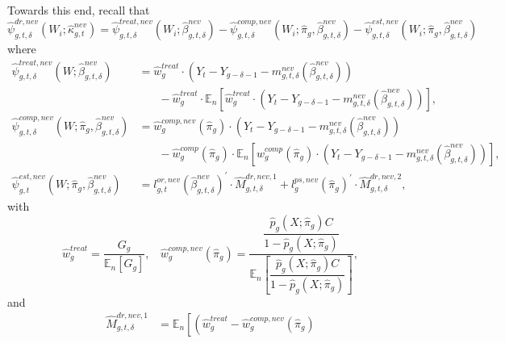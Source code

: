 \documentclass[11pt]{article}%
\theoremstyle{plain}
\numberwithin{sassumption}{section}
\numberwithin{equation}{section}
\begin{document}
{\small Towards this end, recall that%
\[
\widehat{\psi}_{g,t,\delta}^{dr,nev}(W_{i};\widehat{\kappa}_{g,t}%
^{nev})=\widehat{\psi}_{g,t,\delta}^{treat,nev}(W_{i};\widehat{\beta
}_{g,t,\delta}^{nev})-\widehat{\psi}_{g,t,\delta}^{comp,nev}(W_{i}%
;\widehat{\pi}_{g},\widehat{\beta}_{g,t,\delta}^{nev})-\widehat{\psi
}_{g,t,\delta}^{est,nev}(W_{i};\widehat{\pi}_{g},\widehat{\beta}_{g,t,\delta
}^{nev})
\]
where
\begin{align*}
\widehat{\psi}_{g,t,\delta}^{treat,nev}(W;\widehat{\beta}_{g,t,\delta}^{nev})
&  =\widehat{w}_{g}^{treat}\cdot\left(  Y_{t}-Y_{g-\delta-1}-m_{g,t,\delta
}^{nev}\left(  \widehat{\beta}_{g,t,\delta}^{nev}\right)  \right) \\
&  ~~~~~~~~-\widehat{w}_{g}^{treat}\cdot\mathbb{E}_{n}\left[  \widehat{w}%
_{g}^{treat}\cdot\left(  Y_{t}-Y_{g-\delta-1}-m_{g,t,\delta}^{nev}\left(
\widehat{\beta}_{g,t,\delta}^{nev}\right)  \right)  \right]  ,\\
\widehat{\psi}_{g,t,\delta}^{comp,nev}(W;\widehat{\pi}_{g},\widehat{\beta
}_{g,t,\delta}^{nev})  &  =\widehat{w}_{g}^{comp,nev}\left(  \widehat{\pi}%
_{g}\right)  \cdot\left(  Y_{t}-Y_{g-\delta-1}-m_{g,t,\delta}^{nev}\left(
\widehat{\beta}_{g,t,\delta}^{nev}\right)  \right) \\
&  ~~~~~~~~-\widehat{w}_{g}^{comp}\left(  \widehat{\pi}_{g}\right)
\cdot\mathbb{E}_{n}\left[  w_{g}^{comp}\left(  \widehat{\pi}_{g}\right)
\cdot\left(  Y_{t}-Y_{g-\delta-1}-m_{g,t,\delta}^{nev}\left(  \widehat{\beta
}_{g,t,\delta}^{nev}\right)  \right)  \right]  ,\\
\widehat{\psi}_{g,t}^{est,nev}(W;\widehat{\pi}_{g},\widehat{\beta}%
_{g,t,\delta}^{nev})  &  =l_{g,t}^{or,nev}\left(  \widehat{\beta}_{g,t,\delta
}^{nev}\right)  ^{\prime}\cdot\widehat{M}_{g,t,\delta}^{dr,nev,1}%
+l_{g}^{ps,nev}\left(  \widehat{\pi}_{g}\right)  ^{\prime}\cdot\widehat{M}%
_{g,t,\delta}^{dr,nev,2},
\end{align*}
with%
\[
\widehat{w}_{g}^{treat}=\frac{G_{g}}{\mathbb{E}_{n}\left[  G_{g}\right]
},~~~~\widehat{w}_{g}^{comp,nev}\left(  \widehat{\pi}_{g}\right)
=\frac{\dfrac{\widehat{p}_{g}\left(  X;\widehat{\pi}_{g}\right)
C}{1-\widehat{p}_{g}\left(  X;\widehat{\pi}_{g}\right)  }}{\mathbb{E}%
_{n}\left[  \dfrac{\widehat{p}_{g}\left(  X;\widehat{\pi}_{g}\right)
C}{1-\widehat{p}_{g}\left(  X;\widehat{\pi}_{g}\right)  }\right]  },
\]
and%
\begin{align*}
\widehat{M}_{g,t,\delta}^{dr,nev,1}  &  =\mathbb{E}_{n}\left[  \left(
\widehat{w}_{g}^{treat}-\widehat{w}_{g}^{comp,nev}\left(  \widehat{\pi}_{g}\right)

\end{align*}}
\end{document}
